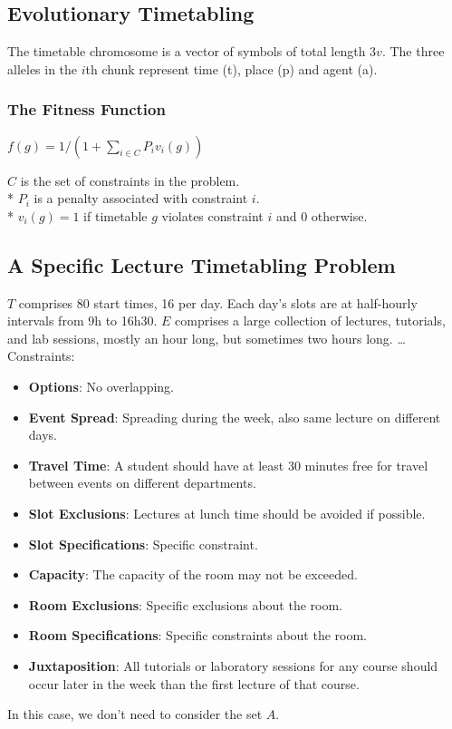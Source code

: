 \documentclass[12pt]{article}
\begin{document}
\subsection{Evolutionary Timetabling}
The timetable chromosome is a vector of symbols of total length $3v$. The three alleles in the $i$th chunk represent time (t), place (p) and agent (a).

\subsubsection{The Fitness Function}
\begin{center}
$f(g) = 1/(1 + \sum_{i \in C} P_i v_i(g))$
\end{center}
$C$ is the set of constraints in the problem.\\*
$P_i$ is a penalty associated with constraint $i$.\\*
$v_i(g) = 1$ if timetable $g$ violates constraint $i$ and 0 otherwise.

\subsection{A Specific Lecture Timetabling Problem}
$T$ comprises 80 start times, 16 per day. Each day's slots are at half-hourly intervals from 9h to 16h30. $E$ comprises a large collection of lectures, tutorials, and lab sessions, mostly an hour long, but sometimes two hours long. \dots\\
Constraints:
\begin{itemize}
\item \textbf{Options}: No overlapping.
\item \textbf{Event Spread}: Spreading during the week, also same lecture on different days.
\item \textbf{Travel Time}: A student should have at least 30 minutes free for travel between events on different departments.
\item \textbf{Slot Exclusions}: Lectures at lunch time should be avoided if possible.
\item \textbf{Slot Specifications}: Specific constraint.
\item \textbf{Capacity}: The capacity of the room may not be exceeded.
\item \textbf{Room Exclusions}: Specific exclusions about the room.
\item \textbf{Room Specifications}: Specific constraints about the room.
\item \textbf{Juxtaposition}: All tutorials or laboratory sessions for any course should occur later in the week than the first lecture of that course.
\end{itemize}
In this case, we don't need to consider the set $A$.
\end{document}
